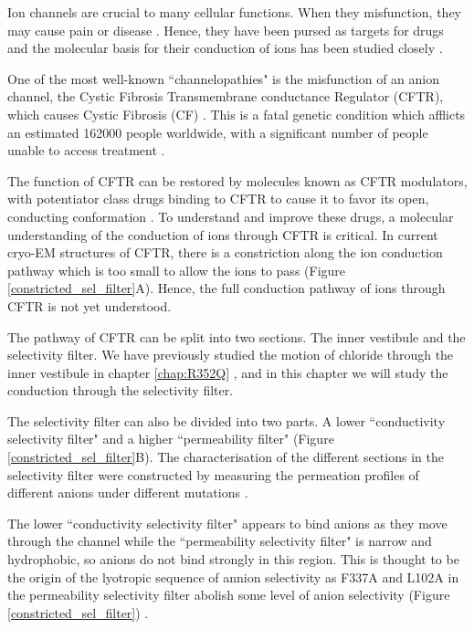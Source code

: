 Ion channels are crucial to many cellular functions. When they misfunction, they may cause pain or disease \cite{}. Hence, they have been pursed as targets for drugs and the molecular basis for their conduction of ions has been studied closely \cite{}.

One of the most well-known ``channelopathies" is the misfunction of an anion channel, the Cystic Fibrosis Transmembrane conductance Regulator (CFTR), which causes Cystic Fibrosis (CF) \cite{riordan1989,gadsby2006}. This is a fatal genetic condition which afflicts an estimated 162000 people worldwide, with a significant number of people unable to access treatment \cite{guo2022}.

The function of CFTR can be restored by molecules known as CFTR modulators, with potentiator class drugs binding to CFTR to cause it to favor its open, conducting conformation \cite{liu2019}. To understand and improve these drugs, a molecular understanding of the conduction of ions through CFTR is critical. In current cryo-EM structures of CFTR, there is a constriction along the ion conduction pathway which is too small to allow the ions to pass \cite{zhang2018} (Figure \ref{constricted_sel_filter}A). Hence, the full conduction pathway of ions through CFTR is not yet understood.

The pathway of CFTR can be split into two sections. The inner vestibule and the selectivity filter. We have previously studied the motion of chloride through the inner vestibule in chapter \ref{chap:R352Q} \cite{wong2022a}, and in this chapter we will study the conduction through the selectivity filter. 

The selectivity filter can also be divided into two parts. A lower ``conductivity selectivity filter" and a higher ``permeability filter" (Figure \ref{constricted_sel_filter}B). The characterisation of the different sections in the selectivity filter were constructed by measuring the permeation profiles of different anions under different mutations \cite{linsdell2016}. 

The lower ``conductivity selectivity filter" appears to bind anions as they move through the channel while the ``permeability selectivity filter" is narrow and hydrophobic, so anions do not bind strongly in this region. This is thought to be the origin of the lyotropic sequence of annion selectivity as F337A and L102A in the permeability selectivity filter abolish some level of anion selectivity (Figure \ref{constricted_sel_filter}) \cite{linsdell2021}. 

